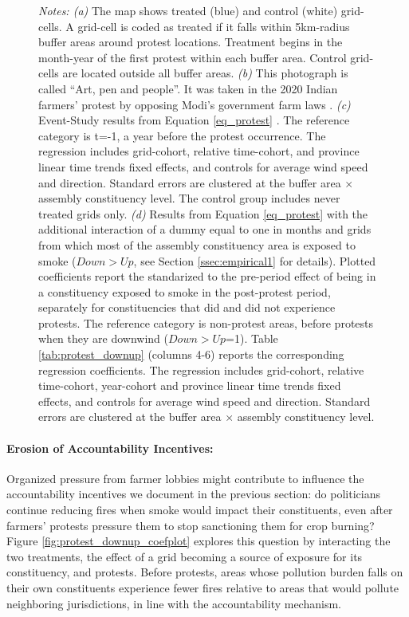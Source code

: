 \documentclass[12pt]{article}
\begin{document}
\begin{figure}[hbtp!]
    
    \begin{minipage}{\textwidth}
        {\small \textit{Notes: (a)} The map shows treated (blue) and control (white) grid-cells. A grid-cell is coded as treated if it falls within 5km-radius buffer areas around protest locations. Treatment begins in the month-year of the first protest within each buffer area. Control grid-cells are located outside all buffer areas.
         \textit{(b)} This photograph is called ``Art, pen and people''. It was taken in the 2020 Indian farmers' protest by opposing Modi's government farm laws \citep{maddoke2020art}.
         \textit{(c)} Event-Study results from Equation \ref{eq_protest} %
         . The reference category is t=-1, a year before the protest occurrence. 
        The regression includes grid-cohort, relative time-cohort, and province linear time trends fixed effects, and controls for  average wind speed and direction. Standard errors are clustered at the buffer area $\times$ assembly constituency level. The control group includes never treated grids only. 
        \textit{(d)} 
        Results from Equation \ref{eq_protest} with the additional interaction of a dummy equal to one in months and grids from which most of the assembly constituency area is exposed to smoke ($Down>Up$, see Section \ref{ssec:empirical1} for details).
        Plotted coefficients report the standarized to the pre-period effect of being in a constituency exposed to smoke in the post-protest period, separately for constituencies that did and did not experience protests. The reference category is non-protest areas, before protests when they are downwind ($Down>Up$=1). 
        Table \ref{tab:protest_downup} (columns 4-6) reports the corresponding regression coefficients.
        The regression includes grid-cohort, relative time-cohort, year-cohort and province linear time trends fixed effects, and controls for average wind speed and direction. Standard errors are clustered at the buffer area $\times$ assembly constituency level.}
    \end{minipage}
\end{figure}






\paragraph{Erosion of Accountability Incentives:}
Organized pressure from farmer lobbies might contribute to influence the accountability incentives we document in the previous section: do politicians continue reducing fires when smoke would impact their constituents, even after farmers' protests pressure them to stop sanctioning them for crop burning? Figure \ref{fig:protest_downup_coefplot} explores this question by interacting the two treatments, the effect of a grid becoming a source of exposure for its constituency, and protests. Before protests, areas whose pollution burden falls on their own constituents experience fewer fires relative to areas that would pollute neighboring jurisdictions, in line with the accountability mechanism. 
\end{document}
